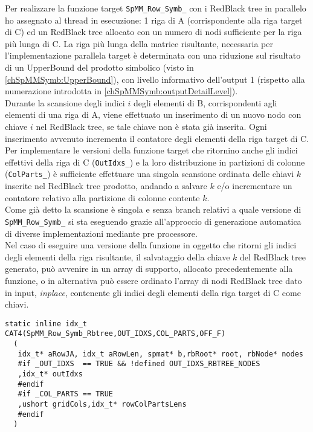 Per realizzare la funzione target \verb|SpMM_Row_Symb_| con i RedBlack tree in parallelo ho assegnato al thread in esecuzione: 
1 riga di A (corrispondente alla riga target di C) ed 
un RedBlack tree allocato con un numero di nodi sufficiente per la riga più lunga di C.
La riga più lunga della matrice risultante, necessaria per l'implementazione parallela target
è determinata con una riduzione sul risultato di un UpperBound  del prodotto simbolico (visto in \ref{chSpMMSymb:UpperBound}),
con livello informativo dell'output 1 (rispetto alla numerazione introdotta in \ref{chSpMMSymb:outputDetailLevel}).\\
Durante la scansione degli indici $i$ degli elementi \nnz di B, corrispondenti agli elementi \nnz di una riga di A, 
viene effettuato un inserimento di un nuovo nodo con chiave $i$ nel RedBlack tree, se tale chiave non è stata già inserita.
Ogni inserimento avvenuto incrementa il contatore degli elementi \nnz della riga target di C.\\
Per implementare le versioni della funzione target che ritornino anche 
gli indici \nnz effettivi della riga di C (\verb|OutIdxs_|) e la loro distribuzione in partizioni di colonne (\verb|ColParts_|) è sufficiente effettuare 
una singola scansione ordinata delle chiavi $k$ inserite nel RedBlack tree prodotto, andando a salvare $k$ e/o incrementare un contatore
relativo alla partizione di colonne contente $k$.\\
Come già detto la scansione è singola e senza branch relativi a quale versione di \verb|SpMM_Row_Symb_| si sta eseguendo grazie all'approccio
di generazione automatica di diverse implementazioni mediante pre processore.\\
\label{OUT_IDXS_RBTREE_NODES}
Nel caso di eseguire una versione della funzione in oggetto
 che ritorni gli indici degli elementi \nnz della riga risultante, %
 il salvataggio della chiave $k$ del RedBlack tree generato,
può avvenire in un array di supporto, allocato precedentemente alla funzione, o 
in alternativa può essere ordinato l'array di nodi RedBlack tree dato in input, \emph{inplace}, 
contenente gli indici degli elementi \nnz della riga target di C come chiavi.\\
\begin{lstlisting}
static inline idx_t CAT4(SpMM_Row_Symb_Rbtree,OUT_IDXS,COL_PARTS,OFF_F)
  (
   idx_t* aRowJA, idx_t aRowLen, spmat* b,rbRoot* root, rbNode* nodes
   #if _OUT_IDXS  == TRUE && !defined OUT_IDXS_RBTREE_NODES 
   ,idx_t* outIdxs
   #endif
   #if _COL_PARTS == TRUE
   ,ushort gridCols,idx_t* rowColPartsLens
   #endif
  )
\end{lstlisting}
